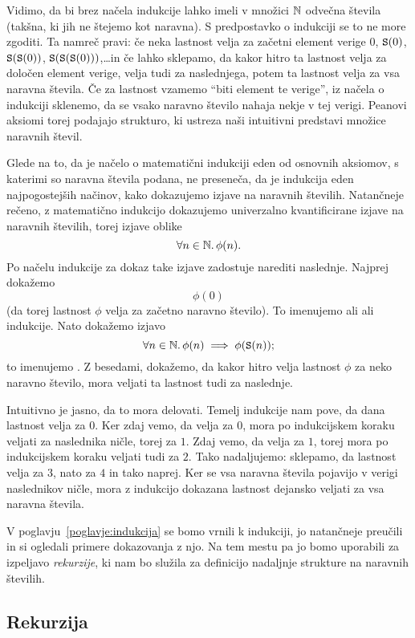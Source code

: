 Vidimo, da bi brez načela indukcije lahko imeli v množici $\mathbb{N}$ odvečna števila (takšna, ki jih ne štejemo kot naravna). S predpostavko o indukciji se to ne more zgoditi. Ta namreč pravi: če neka lastnost velja za začetni element verige $0$, $\mathtt{S}(0)$, $\mathtt{S}(\mathtt{S}(0))$, $\mathtt{S}(\mathtt{S}(\mathtt{S}(0)))$,\ldots in če lahko sklepamo, da kakor hitro ta lastnost velja za določen element verige, velja tudi za naslednjega, potem ta lastnost velja za vsa naravna števila. Če za lastnost vzamemo ``biti element te verige'', iz načela o indukciji sklenemo, da se vsako naravno število nahaja nekje v tej verigi. Peanovi aksiomi torej podajajo strukturo, ki ustreza naši intuitivni predstavi množice naravnih števil.

Glede na to, da je načelo o matematični indukciji eden od osnovnih aksiomov, s katerimi so naravna števila podana, ne preseneča, da je indukcija eden najpogostejših načinov, kako dokazujemo izjave na naravnih številih. Natančneje rečeno, z matematično indukcijo dokazujemo univerzalno kvantificirane izjave na naravnih številih, torej izjave oblike
\[\forall n \in \mathbb{N} .\, \phi(n).\]
Po načelu indukcije za dokaz take izjave zadostuje narediti naslednje. Najprej dokažemo
\[\phi(0)\]
(da torej lastnost $\phi$ velja za začetno naravno število). To imenujemo  ali  ali  indukcije. Nato dokažemo izjavo
\[\forall n \in \mathbb{N} .\, \phi(n) \implies \phi(\mathtt{S}(n));\]
to imenujemo . Z besedami, dokažemo, da kakor hitro velja lastnost $\phi$ za neko naravno število, mora veljati ta lastnost tudi za naslednje.

Intuitivno je jasno, da to mora delovati. Temelj indukcije nam pove, da dana lastnost velja za $0$. Ker zdaj vemo, da velja za $0$, mora po indukcijskem koraku veljati za naslednika ničle, torej za $1$. Zdaj vemo, da velja za $1$, torej mora po indukcijskem koraku veljati tudi za $2$. Tako nadaljujemo: sklepamo, da lastnost velja za $3$, nato za $4$ in tako naprej. Ker se vsa naravna števila pojavijo v verigi naslednikov ničle, mora z indukcijo dokazana lastnost dejansko veljati za vsa naravna števila.

V poglavju~\ref{poglavje:indukcija} se bomo vrnili k indukciji, jo natančneje preučili in si ogledali primere dokazovanja z njo. Na tem mestu pa jo bomo uporabili za izpeljavo \emph{rekurzije}, ki nam bo služila za definicijo nadaljnje strukture na naravnih številih.

\subsection{Rekurzija}

